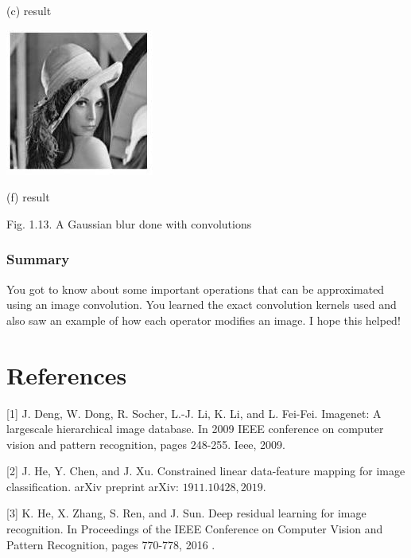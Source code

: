 \documentclass[10pt]{article}
\begin{document}
(c) result

\includegraphics[max width=\textwidth]{2022_01_06_b5ce182ed1bd5f482e5bg-20(5)}

(f) result

Fig. 1.13. A Gaussian blur done with convolutions

\subsubsection{Summary}
You got to know about some important operations that can be approximated using an image convolution. You learned the exact convolution kernels used and also saw an example of how each operator modifies an image. I hope this helped!

\section{References}
[1] J. Deng, W. Dong, R. Socher, L.-J. Li, K. Li, and L. Fei-Fei. Imagenet: A largescale hierarchical image database. In 2009 IEEE conference on computer vision and pattern recognition, pages 248-255. Ieee, 2009.

[2] J. He, Y. Chen, and J. Xu. Constrained linear data-feature mapping for image classification. arXiv preprint arXiv: $1911.10428,2019 .$

[3] $\mathrm{K}$. He, X. Zhang, S. Ren, and J. Sun. Deep residual learning for image recognition. In Proceedings of the IEEE Conference on Computer Vision and Pattern Recognition, pages 770-778, 2016 .
\end{document}
